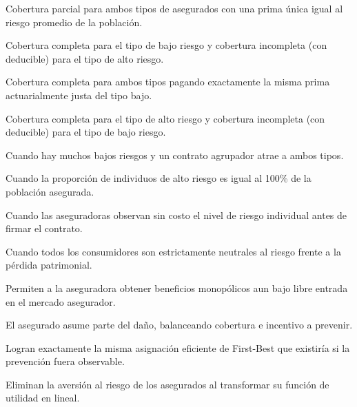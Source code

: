 \begin{opts}
    \item Cobertura parcial para ambos tipos de asegurados con una prima única igual al riesgo promedio de la población.
    \item Cobertura completa para el tipo de bajo riesgo y cobertura incompleta (con deducible) para el tipo de alto riesgo.
    \item Cobertura completa para ambos tipos pagando exactamente la misma prima actuarialmente justa del tipo bajo.
    \item Cobertura completa para el tipo de alto riesgo y cobertura incompleta (con deducible) para el tipo de bajo riesgo.
\end{opts}

\begin{opts}
    \item Cuando hay muchos bajos riesgos y un contrato agrupador atrae a ambos tipos.
    \item Cuando la proporción de individuos de alto riesgo es igual al 100\% de la población asegurada.
    \item Cuando las aseguradoras observan sin costo el nivel de riesgo individual antes de firmar el contrato.
    \item Cuando todos los consumidores son estrictamente neutrales al riesgo frente a la pérdida patrimonial.
\end{opts}

\begin{opts}
    \item Permiten a la aseguradora obtener beneficios monopólicos aun bajo libre entrada en el mercado asegurador.
    \item El asegurado asume parte del daño, balanceando cobertura e incentivo a prevenir.
    \item Logran exactamente la misma asignación eficiente de First-Best que existiría si la prevención fuera observable.
    \item Eliminan la aversión al riesgo de los asegurados al transformar su función de utilidad en lineal.
\end{opts}

